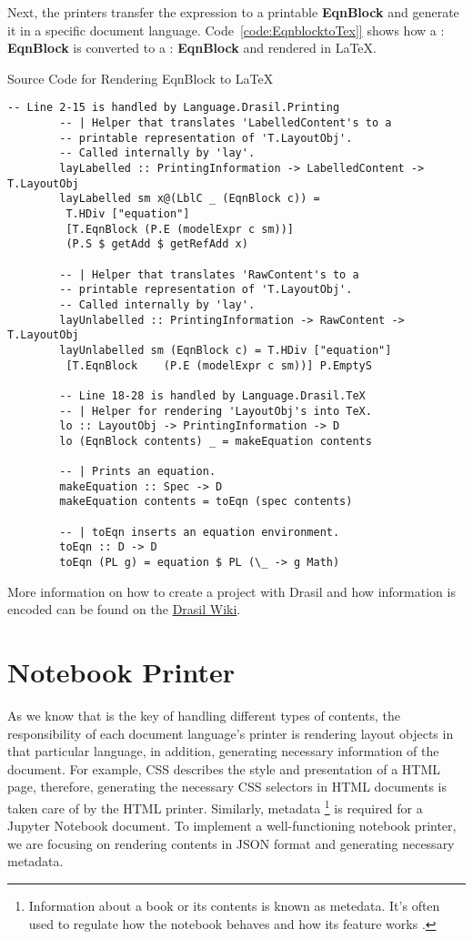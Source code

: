 Next, the printers transfer the expression to a printable \textbf{EqnBlock} and 
generate it in a specific document language. Code~\ref{code:EqnblocktoTex]} 
shows how a : \textbf{EqnBlock} is converted to a 
: \textbf{EqnBlock} and rendered in LaTeX.

\begin{listing}
	\caption{Source Code for Rendering EqnBlock to LaTeX}
	\label{code:EqnblocktoTex]}
	\begin{lstlisting}[language=haskell1]
		-- Line 2-15 is handled by Language.Drasil.Printing
		-- | Helper that translates 'LabelledContent's to a 
		-- printable representation of 'T.LayoutObj'. 
		-- Called internally by 'lay'.
		layLabelled :: PrintingInformation -> LabelledContent -> T.LayoutObj
		layLabelled sm x@(LblC _ (EqnBlock c)) = 
		 T.HDiv ["equation"] 
		 [T.EqnBlock (P.E (modelExpr c sm))]
		 (P.S $ getAdd $ getRefAdd x)
		
		-- | Helper that translates 'RawContent's to a  
		-- printable representation of 'T.LayoutObj'. 
		-- Called internally by 'lay'.
		layUnlabelled :: PrintingInformation -> RawContent -> T.LayoutObj
		layUnlabelled sm (EqnBlock c) = T.HDiv ["equation"] 
		 [T.EqnBlock	(P.E (modelExpr c sm))] P.EmptyS
		
		-- Line 18-28 is handled by Language.Drasil.TeX
		-- | Helper for rendering 'LayoutObj's into TeX.
		lo :: LayoutObj -> PrintingInformation -> D
		lo (EqnBlock contents) _ = makeEquation contents
		
		-- | Prints an equation.
		makeEquation :: Spec -> D
		makeEquation contents = toEqn (spec contents)
		
		-- | toEqn inserts an equation environment.
		toEqn :: D -> D
		toEqn (PL g) = equation $ PL (\_ -> g Math)
	\end{lstlisting}
\end{listing}

More information on how to create a project with Drasil and how information is 
encoded can be found on the 
\href{https://jacquescarette.github.io/Drasil/}{Drasil Wiki}. 

\section{Notebook Printer}
As we know that  is the key of handling different types of 
contents, the responsibility of each document language's printer is rendering 
layout objects in that particular language, in addition, generating necessary 
information of the document. For example, CSS describes the style and 
presentation of a HTML page, therefore, generating the necessary CSS 
selectors in HTML documents is taken care of by the HTML printer. Similarly, 
metadata \footnote{Information about a 
book or its contents is known as metedata. It's often used to regulate how the 
notebook behaves and how its feature works \cite{notebookmetadata}.} is 
required for a Jupyter Notebook document. To implement a well-functioning 
notebook printer, we are focusing on rendering contents in JSON format and 
generating necessary metadata.

